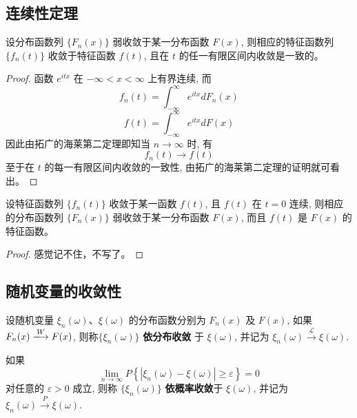 \subsection{连续性定理}\label{subsec:连续性定理}

\begin{theorem}[正极限定理]\label{thm:positive_limit}
设分布函数列 $\{F_n(x)\}$ 弱收敛于某一分布函数 $F(x)$, 则相应的特征函数列 $\{f_n(t)\}$ 收敛于特征函数 $f(t)$, 且在 $t$ 的任一有限区间内收敛是一致的。
\end{theorem}

\begin{proof}
函数 $e^{itx}$ 在 $-\infty < x < \infty$ 上有界连续, 而
\[
f_n(t) = \int_{-\infty}^\infty e^{itx} dF_n(x)
\]
\[
f(t) = \int_{-\infty}^\infty e^{itx} dF(x)
\]
因此由拓广的海莱第二定理即知当 $n \to \infty$ 时, 有
\[
f_n(t) \to f(t)
\]
至于在 $t$ 的每一有限区间内收敛的一致性, 由拓广的海莱第二定理的证明就可看出。
\end{proof}

\begin{theorem}[逆极限定理]\label{thm:inverse_limit}
设特征函数列 $\{f_n(t)\}$ 收敛于某一函数 $f(t)$, 且 $f(t)$ 在 $t=0$ 连续, 则相应的分布函数列 $\{F_n(x)\}$ 弱收敛于某一分布函数 $F(x)$, 而且 $f(t)$ 是 $F(x)$ 的特征函数。
\end{theorem}

\begin{proof}
感觉记不住，不写了。
\end{proof}

\subsection{随机变量的收敛性}\label{subsec:随机变量的收敛性}
\begin{definition}[依分布收敛]\label{def:convergence_in_distribution}
设随机变量 $\xi_n(\omega)$、$\xi(\omega)$ 的分布函数分别为 $F_n(x)$ 及 $F(x)$, 如果 $F_n(x) \xlongrightarrow{W} F(x)$, 则称$\{\xi_n(\omega)\}$ \textbf{依分布收敛} 于 $\xi(\omega)$, 并记为 $\xi_n(\omega) \xrightarrow{\mathscr{L}} \xi(\omega)$.
\end{definition}

\begin{definition}[依概率收敛]\label{def:convergence_in_probability}
如果
\begin{equation} \label{eq:5.2.19}
\lim_{n\to\infty} P\left\{ |\xi_n(\omega)-\xi(\omega)| \ge \varepsilon \right\} = 0
\end{equation}
对任意的 $\varepsilon > 0$ 成立, 则称 $\{\xi_n(\omega)\}$ \textbf{依概率收敛}于 $\xi(\omega)$, 并记为 $\xi_n(\omega) \xrightarrow{P} \xi(\omega)$.
\end{definition}

